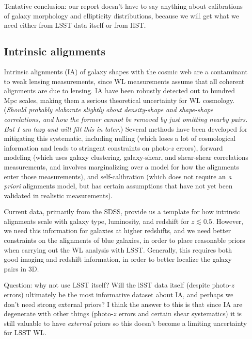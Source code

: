 Tentative conclusion: our report doesn't have to say anything about calibrations of galaxy
morphology and ellipticity distributions, because we will get what we need either from LSST data
itself or from HST.

\subsection{Intrinsic alignments}

Intrinsic alignments (IA) of galaxy shapes with the cosmic web are a contaminant to weak lensing
measurements, since WL measurements assume that all coherent alignments are due to lensing. IA have
been robustly detected out to hundred Mpc scales, making them a serious theoretical uncertainty for
WL cosmology.  ({\em Should probably elaborate slightly about density-shape and shape-shape
  correlations, and how the former cannot be removed by just omitting nearby pairs.  But I am lazy
  and will fill this in later.}) Several methods have been developed for mitigating this systematic,
including nulling (which loses a lot of cosmological information and leads to stringent constraints
on photo-$z$ errors), forward modeling (which uses galaxy clustering, galaxy-shear, and shear-shear
correlations measurements, and involves marginalizing over a model for how the alignments enter
those measurements), and self-calibration (which does not require an {\em a priori} alignments
model, but has certain assumptions that have not yet been validated in realistic measurements).

Current data, primarily from the SDSS, provide us a template for how intrinsic alignments scale with
galaxy type, luminosity, and redshift for $z\lesssim 0.5$.  However, we need this information for
galaxies at higher redshifts, and we need better constraints on the alignments of blue galaxies, in
order to place reasonable priors when carrying out the WL analysis with LSST. Generally, this
requires both good imaging and redshift information, in order to better localize the galaxy pairs in
3D.

Question: why not use LSST itself?  Will the lSST data itself (despite photo-$z$ errors) ultimately
be the most informative dataset about IA, and perhaps we don't need strong external priors?  I think
the answer to this is that since IA are degenerate with other things (photo-$z$ errors and certain
shear systematics) it is still valuable to have {\em external} priors so this doesn't become a
limiting uncertainty for LSST WL.

